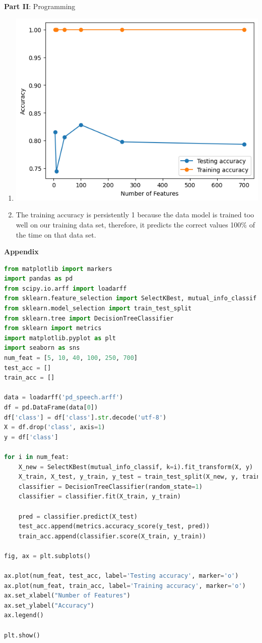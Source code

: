 \documentclass[12pt]{article}
\begin{document}
\center\large{\textbf{Part II}: Programming}

\begin{enumerate}[leftmargin=\labelsep,resume]
\item  \leavevmode\vadjust{\vspace{-\baselineskip}}\newline
\includegraphics{plot}
\item
The training accuracy is persistently 1 because the data model is trained too well on 
our training data set, therefore, it predicts the correct values 100\% of the time on that 
data set.

\end{enumerate}
\newpage
\center\large{\textbf{Appendix}\vskip 0.3cm}

\begin{lstlisting}[language=Python]
from matplotlib import markers
import pandas as pd
from scipy.io.arff import loadarff
from sklearn.feature_selection import SelectKBest, mutual_info_classif
from sklearn.model_selection import train_test_split
from sklearn.tree import DecisionTreeClassifier
from sklearn import metrics
import matplotlib.pyplot as plt
import seaborn as sns
num_feat = [5, 10, 40, 100, 250, 700]
test_acc = []
train_acc = []

data = loadarff('pd_speech.arff')
df = pd.DataFrame(data[0])
df['class'] = df['class'].str.decode('utf-8')
X = df.drop('class', axis=1)
y = df['class']

for i in num_feat:
    X_new = SelectKBest(mutual_info_classif, k=i).fit_transform(X, y)
    X_train, X_test, y_train, y_test = train_test_split(X_new, y, train_size = 0.7, stratify = y,random_state = 1)
    classifier = DecisionTreeClassifier(random_state=1)
    classifier = classifier.fit(X_train, y_train)

    pred = classifier.predict(X_test)
    test_acc.append(metrics.accuracy_score(y_test, pred))
    train_acc.append(classifier.score(X_train, y_train))

fig, ax = plt.subplots()

ax.plot(num_feat, test_acc, label='Testing accuracy', marker='o')
ax.plot(num_feat, train_acc, label='Training accuracy', marker='o')
ax.set_xlabel("Number of Features")
ax.set_ylabel("Accuracy")
ax.legend()

plt.show()
\end{lstlisting}
\end{document}
